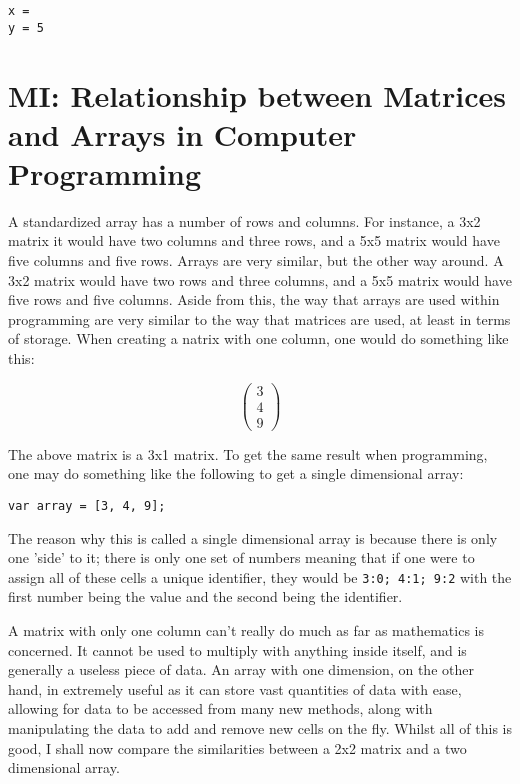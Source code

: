 \documentclass[a4paper,10pt]{article}
\begin{document}
      \texttt{x = }
      \\
      \texttt{y = 5}

    \newpage

    \section{MI: Relationship between Matrices and Arrays in Computer Programming}
      A standardized array has a number of rows and columns. For instance, a 3x2 matrix it would have two columns and three rows, and a 5x5 matrix would have five columns and five rows. Arrays are very similar, but the other way around. A 3x2 matrix would have two rows and three columns, and a 5x5 matrix would have five rows and five columns. Aside from this, the way that arrays are used within programming are very similar to the way that matrices are used, at least in terms of storage. When creating a natrix with one column, one would do something like this:

      \begin{equation*}
        \begin{pmatrix}
          3\\
          4\\
          9
        \end{pmatrix}
      \end{equation*}

      The above matrix is a 3x1 matrix. To get the same result when programming, one may do something like the following to get a single dimensional array:

      \texttt{var array = [3, 4, 9];}

      The reason why this is called a single dimensional array is because there is only one 'side' to it; there is only one set of numbers meaning that if one were to assign all of these cells a unique identifier, they would be \texttt{3:0; 4:1; 9:2} with the first number being the value and the second being the identifier.

      A matrix with only one column can't really do much as far as mathematics is concerned. It cannot be used to multiply with anything inside itself, and is generally a useless piece of data. An array with one dimension, on the other hand, in extremely useful as it can store vast quantities of data with ease, allowing for data to be accessed from many new methods, along with manipulating the data to add and remove new cells on the fly. Whilst all of this is good, I shall now compare the similarities between a 2x2 matrix and a two dimensional array.
\end{document}
